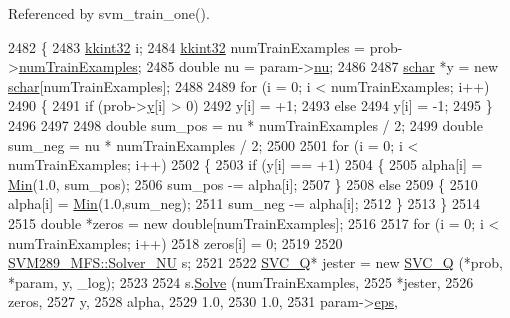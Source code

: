 Referenced by svm\+\_\+train\+\_\+one().


\begin{DoxyCode}
2482 \{
2483   \hyperlink{namespace_k_k_b_a8fa4952cc84fda1de4bec1fbdd8d5b1b}{kkint32}  i;
2484   \hyperlink{namespace_k_k_b_a8fa4952cc84fda1de4bec1fbdd8d5b1b}{kkint32}  numTrainExamples = prob->\hyperlink{struct_s_v_m289___m_f_s_1_1svm__problem_a16d137e053c79776e064691a20fa80ee}{numTrainExamples};
2485   \textcolor{keywordtype}{double} nu = param->\hyperlink{struct_s_v_m289___m_f_s_1_1svm__parameter_a51d3d06c7a7a38a8c315092f14c3029c}{nu};
2486 
2487   \hyperlink{namespace_s_v_m289___m_f_s_a27545e8471784d831870feacd3e831ff}{schar} *y = \textcolor{keyword}{new} \hyperlink{namespace_s_v_m289___m_f_s_a27545e8471784d831870feacd3e831ff}{schar}[numTrainExamples];
2488 
2489   \textcolor{keywordflow}{for}  (i = 0;  i < numTrainExamples;  i++)
2490   \{
2491     \textcolor{keywordflow}{if}  (prob->\hyperlink{struct_s_v_m289___m_f_s_1_1svm__problem_a56cf75f3e15322e1928a8294f9a55d2a}{y}[i] > 0)
2492       y[i] = +1;
2493     \textcolor{keywordflow}{else}
2494       y[i] = -1;
2495   \}
2496 
2497 
2498   \textcolor{keywordtype}{double} sum\_pos = nu * numTrainExamples / 2;
2499   \textcolor{keywordtype}{double} sum\_neg = nu * numTrainExamples / 2;
2500 
2501   \textcolor{keywordflow}{for}  (i = 0;  i < numTrainExamples;  i++)
2502   \{
2503     \textcolor{keywordflow}{if}  (y[i] == +1)
2504     \{
2505       alpha[i] = \hyperlink{_raster_8cpp_a6261a282d8ed27242c636ad5fb658585}{Min}(1.0, sum\_pos);
2506       sum\_pos -= alpha[i];
2507     \}
2508     \textcolor{keywordflow}{else}
2509     \{
2510       alpha[i] = \hyperlink{_raster_8cpp_a6261a282d8ed27242c636ad5fb658585}{Min}(1.0,sum\_neg);
2511       sum\_neg -= alpha[i];
2512     \}
2513   \}
2514 
2515   \textcolor{keywordtype}{double} *zeros = \textcolor{keyword}{new} \textcolor{keywordtype}{double}[numTrainExamples];
2516 
2517   \textcolor{keywordflow}{for}  (i = 0;  i < numTrainExamples;  i++)
2518     zeros[i] = 0;
2519 
2520   \hyperlink{class_s_v_m289___m_f_s_1_1_solver___n_u}{SVM289\_MFS::Solver\_NU}  s;
2521 
2522   \hyperlink{class_s_v_m289___m_f_s_1_1_s_v_c___q}{SVC\_Q}*  jester = \textcolor{keyword}{new} \hyperlink{class_s_v_m289___m_f_s_1_1_s_v_c___q}{SVC\_Q} (*prob, *param, y, \_log);
2523 
2524   s.\hyperlink{class_s_v_m289___m_f_s_1_1_solver___n_u_a64010900d959a38e7385332c9e8b1790}{Solve} (numTrainExamples, 
2525            *jester, 
2526            zeros, 
2527            y,
2528            alpha, 
2529            1.0, 
2530            1.0, 
2531            param->\hyperlink{struct_s_v_m289___m_f_s_1_1svm__parameter_aa5c12a469759ffdc931e8b8ef2496cc4}{eps}, 

\end{DoxyCode}

